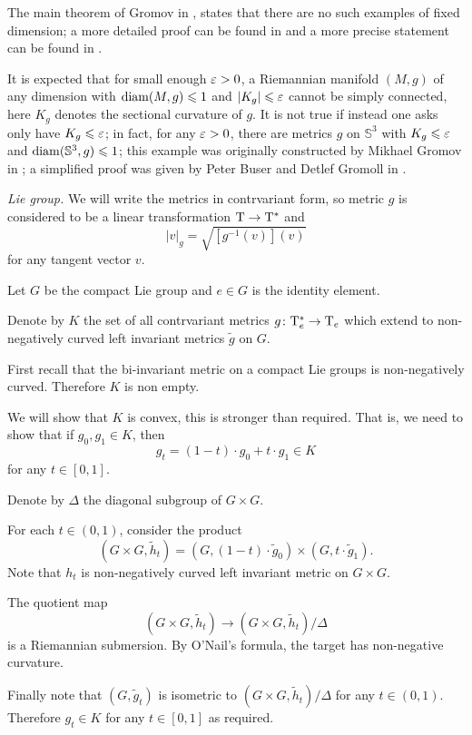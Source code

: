 The main theorem of Gromov in \cite{gromov-almost-flat}, 
states that there are no such examples of fixed dimension;
a more detailed proof can be found in \cite{buser-karcher}
and a more precise statement can be found in \cite{ruh}.

It is expected that for small enough $\varepsilon>0$,
a Riemannian manifold $(M,g)$ of any dimension 
with  $\operatorname{\rm diam}(M,g)\leqslant 1$ and $|K_g|\leqslant \varepsilon$ cannot be simply connected,
here $K_g$ denotes the sectional curvature of $g$.
It is not true if instead one asks only have $K_g\leqslant \varepsilon$;
in fact, 
for any $\varepsilon>0$,
there are metrics $g$ on $\mathbb{S}^3$ 
with $K_g\leqslant \varepsilon$ and $\operatorname{\rm diam}(\mathbb{S}^3,g)\leqslant 1$; 
this example was originally constructed by Mikhael Gromov in \cite{gromov-almost-flat}; 
a simplified proof was given by 
Peter Buser
and Detlef Gromoll in \cite{buser-gromoll}.


\textit{Lie group.} We will write the metrics in contrvariant form, 
so metric $g$ is considered to be a linear transformation $\mathrm{T}\to \mathrm{T}^*$ and 
\[|v|_g=\sqrt{[g^{-1}(v)](v)}\]
for any tangent vector $v$.


Let $G$ be the compact Lie group and $e\in G$ is the identity element.

Denote by $K$ the set of all contrvariant metrics $g\colon\mathrm{T}^*_e\to \mathrm{T}_e $ 
which extend to non-negatively curved left invariant metrics $\tilde g$ on $G$. 

First recall that the bi-invariant metric on a compact Lie groups is non-negatively curved. 
Therefore $K$ is non empty.

We will show that $K$ is convex, this is stronger than required.
That is, 
we need to show that if $g_0, g_1\in K$,
then 
\[g_t=(1-t)\cdot g_0+t\cdot g_1\in K\] 
for any $t\in [0,1]$.

Denote by $\Delta$ the diagonal subgroup of $G\times G$.

For each $t\in (0,1)$, consider the product 
\[(G\times G,\tilde h_t)
=
(G,(1-t)\cdot \tilde g_0)\times (G,t\cdot \tilde g_1).\]
Note that $h_t$ is non-negatively curved left invariant metric on $G\times G$.

The quotient map 
\[
 (G\times G,\tilde h_t)\to (G\times G,\tilde h_t)/\Delta
\]
is a Riemannian submersion.
By O'Nail's formula,
the target has non-negative curvature.

Finally note that $(G,\tilde g_t)$
is isometric to
$(G\times G,\tilde h_t)/\Delta$ for any $t\in (0,1)$.
Therefore $g_t\in K$ for any $t\in [0,1]$ as required.

